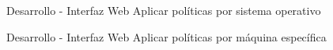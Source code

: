 \begin{frame}{Desarrollo - Interfaz Web}
    \vspace{0cm} {Aplicar políticas por sistema operativo}
    \vspace{0cm}
    \begin{figure}[ht]
       \centering
    \end{figure}

\end{frame}

\begin{frame}{Desarrollo - Interfaz Web}
    \vspace{0cm} {Aplicar políticas por máquina específica}
    \vspace{0cm}
    \begin{figure}[ht]
       \centering
    \end{figure}

\end{frame}

